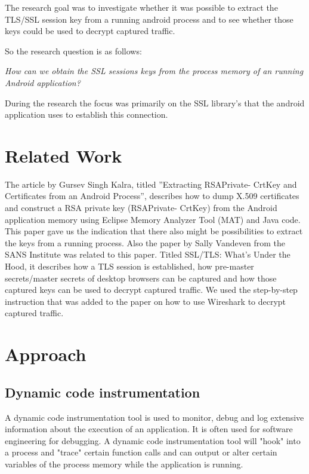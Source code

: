 \documentclass[12pt, a4paper]{report}
\begin{document}
The research goal was to investigate whether it was possible to extract the TLS/SSL session key from a running android process and to see whether those keys could be used to decrypt captured traffic. 

So the research question is as follows:

\begin{framed}
\noindent \textit{How can we obtain the SSL sessions keys from the process memory of an running Android application?}
\end{framed}

During the research the focus was primarily on the SSL library's that the android application uses to establish this connection.

\chapter{Related Work}
The article by Gursev Singh Kalra, titled ”Extracting RSAPrivate-
CrtKey and Certificates from an Android Process”, describes how to
dump X.509 certificates and construct a RSA private key (RSAPrivate-
CrtKey) from the Android application memory using Eclipse Memory
Analyzer Tool (MAT) and Java code. This paper gave us the indication that there also might be possibilities to extract the keys from a running
process.\cite{ref1}
\newline
\newline
Also the paper by Sally Vandeven from the SANS Institute was related to this paper. Titled SSL/TLS: What's Under the Hood, it describes how a TLS session is established, how pre-master secrets/master secrets of desktop browsers can be captured and how those captured keys can be used to decrypt captured traffic. We used the step-by-step instruction that was added to the paper on how to use Wireshark to decrypt captured traffic.\cite{ref2}

\chapter{Approach}
\section{Dynamic code instrumentation}

A dynamic code instrumentation tool is used to monitor, debug and log extensive information about the execution of an application. It is often used for software engineering for debugging. A dynamic code instrumentation tool will "hook" into a process and "trace" certain function calls and can output or alter certain variables of the process memory while the application is running.
\end{document}
